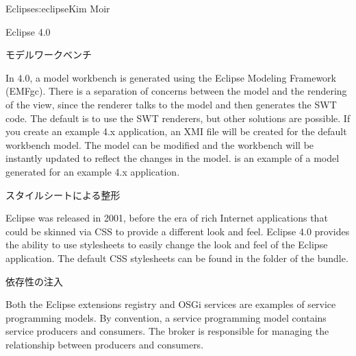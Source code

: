 \begin{aosachapter}{Eclipse}{s:eclipse}{Kim Moir}
\begin{aosasect1}{Eclipse 4.0}
\begin{aosasect2}{モデルワークベンチ}

In 4.0, a model workbench is generated using the Eclipse Modeling
Framework (EMFgc). There is a separation of concerns between the model
and the rendering of the view, since the renderer talks to the model
and then generates the SWT code. The default is to use the SWT
renderers, but other solutions are possible.  If you create an example
4.x application, an XMI file will be created for the default workbench
model. The model can be modified and the workbench will be instantly
updated to reflect the changes in the model. 
is an example of a model generated for an example 4.x application.


\end{aosasect2}

\begin{aosasect2}{スタイルシートによる整形}

Eclipse was released in 2001, before the era of rich Internet
applications that could be skinned via CSS to provide a different look
and feel. Eclipse 4.0 provides the ability to use stylesheets to
easily change the look and feel of the Eclipse application. The
default CSS stylesheets can be found in the  folder of the
 bundle.

\end{aosasect2}

\begin{aosasect2}{依存性の注入}

Both the Eclipse extensions registry and OSGi services are examples of service
programming models. By convention, a service programming model contains service
producers and consumers. The broker is responsible for managing the
relationship between producers and consumers.



\end{aosasect2}
\end{aosasect1}
\end{aosachapter}

